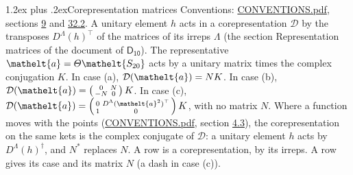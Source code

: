 \documentclass[10pt,a4paper]{article}
\makeatletter
\renewcommand\section{\@startsection{section}{1}{\z@}{-3ex plus -1ex minus -.2ex}%
  {1.2ex plus .2ex}{\normalfont\large\sffamily\bfseries\color{parttitle}}}
\numberwithin{equation}{section}
\newcommand{\eltfont}[1]{{\let\sigma\eltsigma\mathelt{#1}}}
\newcommand{\grp}[1]{\mathsf{#1}}
\newcommand{\elt}[1]{\eltfont{#1}}
\makeatother
\begin{document}
\section{Corepresentation matrices}\label{s:corep_matrices}
Conventions: \href{../../CONVENTIONS.pdf}{CONVENTIONS.pdf}, sections \href{../../../rotation/CONVENTIONS.pdf\#conv.9}{9} and \href{../../CONVENTIONS.pdf\#conv.32.2}{32.2}.
A unitary element $h$ acts in a corepresentation $\mathcal{D}$ by the transposes $D^{\Lambda}(h)^{\top}$ of the matrices of its irreps $\Lambda$ (the section Representation matrices of the document of \href{../../../rotation/data/pdf/D10.pdf}{$\grp{D_{10}}$}). The representative $\elt{a} = \varTheta\elt{S_{20}}$ acts by a unitary matrix times the complex conjugation $K$.
In case (a), $\mathcal{D}(\elt{a}) = NK$. In case (b), $\mathcal{D}(\elt{a}) = \left(\begin{smallmatrix} 0 & N \\ -N & 0 \end{smallmatrix}\right) K$. In case (c), $\mathcal{D}(\elt{a}) = \left(\begin{smallmatrix} 0 & D^{\Lambda}(\elt{a}^2)^{\top} \\ 1 & 0 \end{smallmatrix}\right) K$, with no matrix $N$.
Where a function moves with the points (\href{../../CONVENTIONS.pdf}{CONVENTIONS.pdf}, section \href{../../../rotation/CONVENTIONS.pdf\#conv.4.3}{4.3}), the corepresentation on the same kets is the complex conjugate of $\mathcal{D}$: a unitary element $h$ acts by $D^{\Lambda}(h)^{\dagger}$, and $N^{*}$ replaces $N$.
A row is a corepresentation, by its irreps. A row gives its case and its matrix $N$ (a dash in case (c)).
\end{document}
